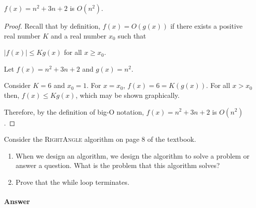 \documentclass{article}
\begin{document}

\begin{theorem}
	$f(x)=n^2 + 3n +2$ is $O(n^2)$.
\end{theorem}
\begin{proof}
	Recall that by definition, $f(x) = O(g(x))$ if there exists a positive real number $K$ and a real number $x_0$
	such that

	$|f(x)|\leq K g(x)$ for all $x \geq x_0$.

	Let $f(x)=n^2 + 3n + 2$ and $g(x) = n^2$.

	Consider $K=6$ and $x_0=1$. For $x=x_0$, $f(x)=6=K(g(x))$. For all $x > x_0$ then, $f(x) \leq K g(x)$, which may
	be shown graphically. 

	Therefore, by the definition of big-O notation, $f(x)=n^2 + 3n + 2$ is $O(n^2)$.

\end{proof}




\nextprob
Consider the \textsc{RightAngle} algorithm on page 8 of the textbook.
\begin{enumerate}
    \item When we design an algorithm, we design the algorithm to solve a
        problem or answer a question.  What is the problem that this algorithm
        solves?
    \item Prove that the while loop terminates.
\end{enumerate}

\paragraph{Answer}

\end{document}
